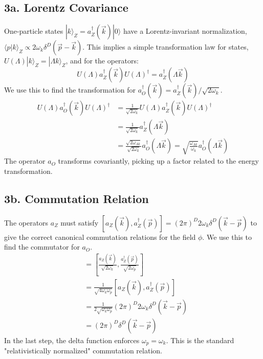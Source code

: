 \documentclass[11pt, a4paper]{article}
\begin{document}
\subsection*{3a. Lorentz Covariance}
One-particle states $|k\rangle_Z = a_Z^\dagger(\vec{k})|0\rangle$ have a Lorentz-invariant normalization, $\langle p|k \rangle_Z \propto 2\omega_k \delta^D(\vec{p}-\vec{k})$. This implies a simple transformation law for states, $U(\Lambda)|k\rangle_Z = |\Lambda k\rangle_Z$, and for the operators:
\[ U(\Lambda) a_Z^\dagger(\vec{k}) U(\Lambda)^\dagger = a_Z^\dagger(\Lambda\vec{k}) \]
We use this to find the transformation for $a_O^\dagger(\vec{k}) = a_Z^\dagger(\vec{k})/\sqrt{2\omega_k}$.
\begin{align*}
    U(\Lambda) a_O^\dagger(\vec{k}) U(\Lambda)^\dagger &= \frac{1}{\sqrt{2\omega_k}} U(\Lambda) a_Z^\dagger(\vec{k}) U(\Lambda)^\dagger \\
    &= \frac{1}{\sqrt{2\omega_k}} a_Z^\dagger(\Lambda\vec{k}) \\
    &= \frac{\sqrt{2\omega_{\Lambda k}}}{\sqrt{2\omega_k}} a_O^\dagger(\Lambda\vec{k}) = \sqrt{\frac{\omega_{\Lambda k}}{\omega_k}} a_O^\dagger(\Lambda\vec{k})
\end{align*}
The operator $a_O$ transforms covariantly, picking up a factor related to the energy transformation.

\subsection*{3b. Commutation Relation}
The operators $a_Z$ must satisfy $[a_Z(\vec{k}), a_Z^\dagger(\vec{p})] = (2\pi)^D 2\omega_k \delta^D(\vec{k}-\vec{p})$ to give the correct canonical commutation relations for the field $\phi$. We use this to find the commutator for $a_O$.
\begin{align*}
    [a_O(\vec{k}), a_O^\dagger(\vec{p})] &= \left[ \frac{a_Z(\vec{k})}{\sqrt{2\omega_k}}, \frac{a_Z^\dagger(\vec{p})}{\sqrt{2\omega_p}} \right] \\
    &= \frac{1}{\sqrt{4\omega_k \omega_p}} [a_Z(\vec{k}), a_Z^\dagger(\vec{p})] \\
    &= \frac{1}{2\sqrt{\omega_k \omega_p}} (2\pi)^D 2\omega_k \delta^D(\vec{k}-\vec{p}) \\
    &= (2\pi)^D \delta^D(\vec{k}-\vec{p})
\end{align*}
In the last step, the delta function enforces $\omega_p = \omega_k$. This is the standard "relativistically normalized" commutation relation.
\end{document}
